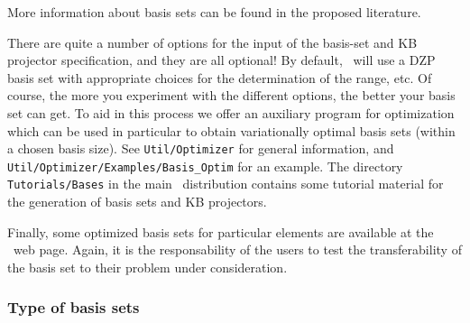 More information about basis sets can be found in the proposed
literature.


\noindent

There are quite a number of options for the input of the basis-set and
KB projector specification, and they are all optional! By default,
\siesta\ will use a DZP basis set with appropriate choices for the
determination of the range, etc. Of course, the more you experiment
with the different options, the better your basis set can get. To aid
in this process we offer an auxiliary program for optimization which
can be used in particular to obtain variationally optimal basis sets
(within a chosen basis size). See \texttt{Util/Optimizer}
for general information, and \texttt{Util/Optimizer/Examples/Basis\_Optim}
for an example. The directory \texttt{Tutorials/Bases} in the main \siesta\
distribution contains some tutorial material for the generation of
basis sets and KB projectors.

Finally, some optimized basis sets for particular elements are
available at the \siesta\ web page.  Again, it is the
responsability of the users to test the transferability of the basis
set to their problem under consideration.


\subsubsection{Type of basis sets}

